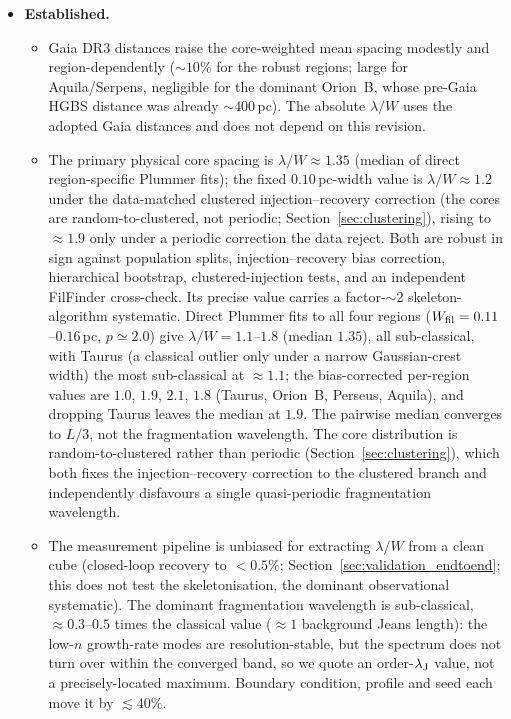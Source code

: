\documentclass[usenatbib,twoside,twocolumn]{mnras}
\begin{document}
\begin{itemize}
    \item \textbf{Established.}
    \begin{itemize}
        \item Gaia DR3 distances raise the core-weighted mean spacing modestly and region-dependently ($\sim10\%$ for the robust regions; large for Aquila/Serpens, negligible for the dominant Orion~B, whose pre-Gaia HGBS distance was already $\sim400$\,pc). The absolute $\lambda/W$ uses the adopted Gaia distances and does not depend on this revision.
        \item The primary physical core spacing is $\lambda/W\approx1.35$ (median of direct region-specific Plummer fits); the fixed $0.10$\,pc-width value is $\lambda/W\approx1.2$ under the data-matched clustered injection--recovery correction (the cores are random-to-clustered, not periodic; Section~\ref{sec:clustering}), rising to $\approx1.9$ only under a periodic correction the data reject. Both are robust in sign against population splits, injection--recovery bias correction, hierarchical bootstrap, clustered-injection tests, and an independent FilFinder cross-check. Its precise value carries a factor-$\sim$2 skeleton-algorithm systematic. Direct Plummer fits to all four regions ($W_{\rm fil}=0.11$--$0.16$\,pc, $p\simeq2.0$) give $\lambda/W=1.1$--$1.8$ (median $1.35$), all sub-classical, with Taurus (a classical outlier only under a narrow Gaussian-crest width) the most sub-classical at $\approx1.1$; the bias-corrected per-region values are $1.0$, $1.9$, $2.1$, $1.8$ (Taurus, Orion~B, Perseus, Aquila), and dropping Taurus leaves the median at $1.9$. The pairwise median converges to $L/3$, not the fragmentation wavelength. The core distribution is random-to-clustered rather than periodic (Section~\ref{sec:clustering}), which both fixes the injection--recovery correction to the clustered branch and independently disfavours a single quasi-periodic fragmentation wavelength.
        \item The measurement pipeline is unbiased for extracting $\lambda/W$ from a clean cube (closed-loop recovery to $<0.5\%$; Section~\ref{sec:validation_endtoend}; this does not test the skeletonisation, the dominant observational systematic). The dominant fragmentation wavelength is sub-classical, $\approx0.3$--$0.5$ times the classical value ($\approx1$ background Jeans length): the low-$n$ growth-rate modes are resolution-stable, but the spectrum does not turn over within the converged band, so we quote an order-$\lambda_{\rm J}$ value, not a precisely-located maximum. Boundary condition, profile and seed each move it by $\lesssim40\%$.

\end{itemize}
\end{itemize}
\end{document}
